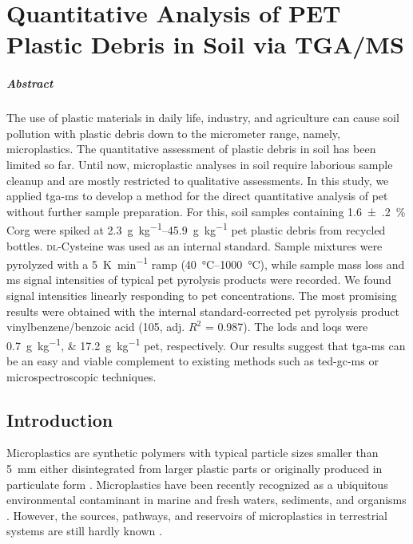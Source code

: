 
\chapter{Quantitative Analysis of PET Plastic Debris in Soil via TGA/MS}
\label{ch:tga-ms-method}

\paragraph{Abstract} The use of plastic materials in daily life, industry, and agriculture can cause soil pollution with plastic debris down to the micrometer range, namely, microplastics.
The quantitative assessment of plastic debris in soil has been limited so far. Until now, microplastic analyses in soil require laborious sample cleanup and are mostly restricted to qualitative assessments. In this study, we applied \ac{tga-ms} to develop a method for the direct quantitative analysis of \ac{pet} without further sample preparation.
For this, soil samples containing \SI{1.6(2)}{\percent} \ac{Corg} were spiked at \SIrange{2.3}{45.9}{\gram\per\kilo\gram} \ac{pet} plastic debris from recycled bottles. \textsc{dl}-Cysteine was used as an internal standard. Sample mixtures were pyrolyzed with a \SI{5}{\kelvin\per\minute} ramp (\SIrange{40}{1000}{\degreeCelsius}), while sample mass loss and \ac{ms} signal intensities of typical \ac{pet} pyrolysis products were recorded.
We found signal intensities linearly responding to \ac{pet} concentrations. The most promising results were obtained with the internal standard-corrected \ac{pet} pyrolysis product vinylbenzene\slash benzoic acid (\SI{105}{\mz}, adj. $R^2$ = \num{0.987}). The \acp{lod} and \acp{loq} were \SIlist{0.7;17.2}{\gram\per\kilo\gram} \ac{pet}, respectively.
Our results suggest that \ac{tga-ms} can be an easy and viable complement to existing methods such as \ac{ted-gc-ms} or microspectroscopic techniques.

\section{Introduction}

Microplastics are synthetic polymers with typical particle sizes smaller than \SI{5}{\milli\meter} either disintegrated from larger plastic parts or originally produced in particulate form \citep{CincinelliMicroplastic2017}.
Microplastics have been recently recognized as a ubiquitous environmental contaminant in marine and fresh waters, sediments, and organisms \citep{KarlssonScreening2017,RochmanMicroplastics2018}. However, the sources, pathways, and reservoirs of microplastics in terrestrial systems are still hardly known \citep{DrisSynthetic2016}.

